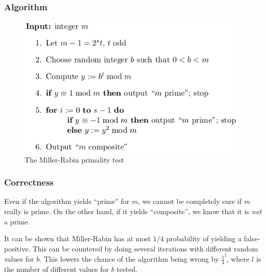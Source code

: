 \subsubsection*{Algorithm}
\begin{figure}[H]
  \begin{centering}
    \includegraphics[width=11cm]{images/7-miller-rabin}
    \caption{The Miller-Rabin primality test}
  \end{centering}
\end{figure}

\subsubsection*{Correctness}
Even if the algorithm yields ``prime'' for $m$, we cannot be
completely sure if $m$ really is prime. On the other hand, if it
yields ``composite'', we know that it is \emph{not} a prime.

It can be shown that Miller-Rabin has at most $1/4$ probability of
yielding a false-positive. This can be countered by doing several
iterations with different random values for $b$. This lowers the
chance of the algorithm being wrong by $\frac{1}{4}^l$, where $l$ is
the number of different values for $b$ tested.
